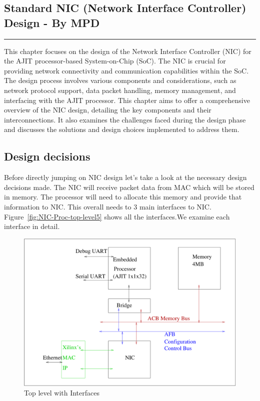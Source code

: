 \documentclass[12pt]{report}
\begin{document}
\begin{appendices}


\chapter{ Standard NIC (Network Interface Controller) Design - By MPD}

\rule[10pt]{\linewidth}{3pt}

This chapter focuses on the design of the Network Interface Controller (NIC) for the AJIT processor-based System-on-Chip (SoC). The NIC is crucial for providing network connectivity and communication capabilities within the SoC. The design process involves various components and considerations, such as network protocol support, data packet handling, memory management, and interfacing with the AJIT processor. This chapter aims to offer a comprehensive overview of the NIC design, detailing the key components and their interconnections. It also examines the challenges faced during the design phase and discusses the solutions and design choices implemented to address them.
	
	\section{Design decisions}
		Before directly jumping on NIC design let's take a look at the necessary design decisions made. The NIC will receive packet data from MAC
		which will be stored in memory. The processor will need to allocate this memory and provide that information to NIC. This overall needs to
		3 main interfaces to NIC. Figure~\ref{fig:NIC-Proc-top-level5} shows all the interfaces.We examine each interface in detail.	

		\begin{figure}[h]
			\centering
			\includegraphics[width=12cm]{../figures/top_level_for_interfaces.pdf}
			\caption{Top level with Interfaces}
			\label{fig:NIC-Proc-top-level6}
		\end{figure}





\end{appendices}
\end{document}
